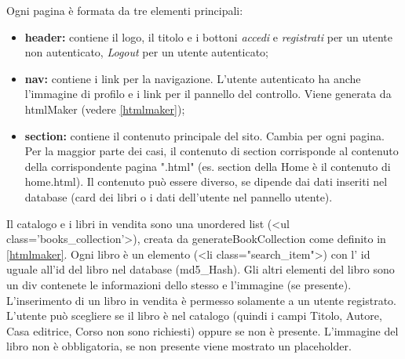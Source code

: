 Ogni pagina è formata da tre elementi principali:
\begin{itemize}
    \item \textbf{header:} contiene il logo, il titolo e i bottoni \textit{accedi} e \textit{registrati} per un utente non autenticato, \textit{Logout} per un utente autenticato;
    \item \textbf{nav:} contiene i link per la navigazione. L'utente autenticato ha anche l'immagine di profilo e i link per il pannello del controllo. Viene generata da htmlMaker (vedere \ref{htmlmaker});
    \item \textbf{section:} contiene il contenuto principale del sito. Cambia per ogni pagina. Per la maggior parte dei casi, il contenuto di section corrisponde al contenuto della corrispondente pagina ".html" (es. section della Home è il contenuto di home.html). Il contenuto può essere diverso, se dipende dai dati inseriti nel database (card dei libri o i dati dell'utente nel pannello utente).
\end{itemize}
Il catalogo e i libri in vendita sono una unordered list (<ul class='books\_collection'>), creata da generateBookCollection come definito in \ref{htmlmaker}. Ogni libro è un elemento (<li class="search\_item">) con l' id uguale all'id del libro nel database (md5\_Hash). Gli altri elementi del libro sono un div contenete le informazioni dello stesso e l'immagine (se presente).\\
L'inserimento di un libro in vendita è permesso solamente a un utente registrato. L'utente può scegliere se il libro è nel catalogo (quindi i campi Titolo, Autore, Casa editrice, Corso non sono richiesti) oppure se non è presente. L'immagine del libro non è obbligatoria, se non presente viene mostrato un placeholder.

